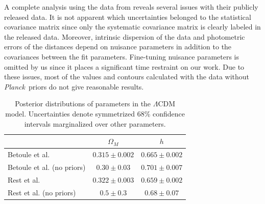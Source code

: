 \documentclass[12pt,a4paper]{article}
\newcommand\Planck{{\it Planck}\ }
\begin{document}
A complete analysis using the data from \citet{rest2014} reveals  
several issues with their publicly released data. It is not apparent 
which uncertainties belonged to the statistical covariance matrix since 
only the systematic covariance matrix is clearly labeled in the released data. Moreover, intrinsic 
dispersion of the data and photometric errors of the distances depend on nuisance 
parameters in addition to the covariances between the fit parameters. Fine-tuning 
nuisance parameters is omitted by us since it places a significant time restraint on our work. Due to 
these issues, most of the values and contours calculated with the \citet{rest2014} data without 
\Planck priors do not give reasonable results. 
%
\begin{table}[h]
   \centering
    \begin{tabular}{l|cc}
    ~                          & $\Omega_M$ & $h$ \\ \hline
    Betoule et al.             & $0.315 \pm 0.002$      & $0.665 \pm 0.002$ \\
    Betoule et al. (no priors) & $0.30 \pm 0.03$      & $0.701 \pm 0.007$ \\
    Rest et al.                & $0.322 \pm 0.003$      & $0.659 \pm 0.002$ \\
    Rest et al. (no priors)    & $0.5 \pm 0.3$      & $0.68 \pm 0.07$ \\
    \end{tabular}
    \caption {\label{tab:lcdm}Posterior distributions of parameters in the
      $\Lambda$CDM model. Uncertainties denote symmetrized 68\%
      confidence intervals marginalized over other parameters.}
\end{table}
%
\end{document}
